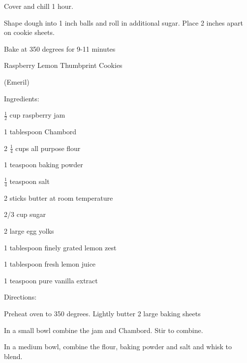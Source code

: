 \documentclass[a4paper,portrait,12pt]{book}
\begin{document}
Cover and chill 1 hour.




Shape dough into 1 inch balls and roll in additional sugar. Place 2 inches apart on cookie sheets.




Bake at 350 degrees for 9-11 minutes







\newpage
Raspberry Lemon Thumbprint Cookies




(Emeril)




Ingredients:




$\frac{1}{2}$ cup raspberry jam




1 tablespoon Chambord




2 $\frac{1}{4}$ cups all purpose flour




1 teaspoon baking powder




$\frac{1}{4}$ teaspoon salt




2 sticks butter at room temperature




2/3 cup sugar




2 large egg yolks




1 tablespoon finely grated lemon zest




1 tablespoon fresh lemon juice




1 teaspoon pure vanilla extract




Directions:




Preheat oven to 350 degrees. Lightly butter 2 large baking sheets




In a small bowl combine the jam and Chambord. Stir to combine.




In a medium bowl, combine the flour, baking powder and salt and whisk to blend.
\end{document}
